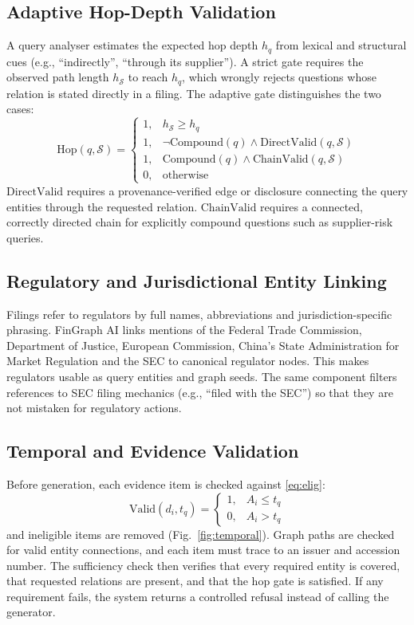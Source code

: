 \documentclass[conference]{IEEEtran}
\begin{document}
\subsection{Adaptive Hop-Depth Validation}
A query analyser estimates the expected hop depth $h_q$ from lexical and structural cues (e.g., ``indirectly'', ``through its supplier''). A strict gate requires the observed path length $h_{\mathcal{S}}$ to reach $h_q$, which wrongly rejects questions whose relation is stated directly in a filing. The adaptive gate distinguishes the two cases:
\begin{equation}
\mathrm{Hop}(q,\mathcal{S}) =
\begin{cases}
1, & h_{\mathcal{S}} \ge h_q\\
1, & \neg\mathrm{Compound}(q) \wedge \mathrm{DirectValid}(q,\mathcal{S})\\
1, & \mathrm{Compound}(q) \wedge \mathrm{ChainValid}(q,\mathcal{S})\\
0, & \text{otherwise}
\end{cases}
\end{equation}
$\mathrm{DirectValid}$ requires a provenance-verified edge or disclosure connecting the query entities through the requested relation. $\mathrm{ChainValid}$ requires a connected, correctly directed chain for explicitly compound questions such as supplier-risk queries.

\subsection{Regulatory and Jurisdictional Entity Linking}
Filings refer to regulators by full names, abbreviations and jurisdiction-specific phrasing. FinGraph AI links mentions of the Federal Trade Commission, Department of Justice, European Commission, China's State Administration for Market Regulation and the SEC to canonical regulator nodes. This makes regulators usable as query entities and graph seeds. The same component filters references to SEC filing mechanics (e.g., ``filed with the SEC'') so that they are not mistaken for regulatory actions.

\subsection{Temporal and Evidence Validation}
Before generation, each evidence item is checked against \eqref{eq:elig}:
\begin{equation}
\mathrm{Valid}(d_i,t_q) =
\begin{cases}
1, & A_i \le t_q\\
0, & A_i > t_q
\end{cases}
\end{equation}
and ineligible items are removed (Fig.~\ref{fig:temporal}). Graph paths are checked for valid entity connections, and each item must trace to an issuer and accession number. The sufficiency check then verifies that every required entity is covered, that requested relations are present, and that the hop gate is satisfied. If any requirement fails, the system returns a controlled refusal instead of calling the generator.
\end{document}
